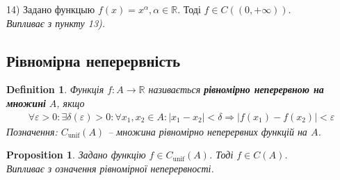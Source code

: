 \documentclass[a4paper, 14pt]{article}
\theoremstyle{theoremdd}
\theoremstyle{theoremdd}
\newtheorem{definition}[theorem]{Definition}
\theoremstyle{theoremdd}
\theoremstyle{theoremdd}
\theoremstyle{theoremdd}
\newtheorem{proposition}[theorem]{Proposition}
\theoremstyle{theoremdd}
\theoremstyle{theoremdd}
\theoremstyle{theoremdd}
\begin{document}
14) Задано функцыю $f(x) = x^\alpha, \alpha \in \mathbb{R}$. Тоді $f \in C((0,+\infty))$.\\
\textit{Випливає з пункту 13).}

\subsection{Рівномірна неперервність}
\begin{definition}
Функція $f \colon A \to \mathbb{R}$ називається \textbf{рівномірно неперервною на множині} $A$, якщо
\begin{align*}
\forall \varepsilon > 0: \exists \delta(\varepsilon) > 0: \forall x_1,x_2 \in A: |x_1-x_2|<\delta \Rightarrow |f(x_1) - f(x_2)| < \varepsilon
\end{align*}
Позначення: $C_{\text{unif}}(A)$ -- множина рівномірно неперервних функцій на $A$.
\end{definition}

\begin{proposition}
Задано функцію $f \in C_{\text{unif}}(A)$. Тоді $f \in C(A)$.\\
\textit{Випливає з означення рівномірної неперервності.}
\end{proposition}
\end{document}
